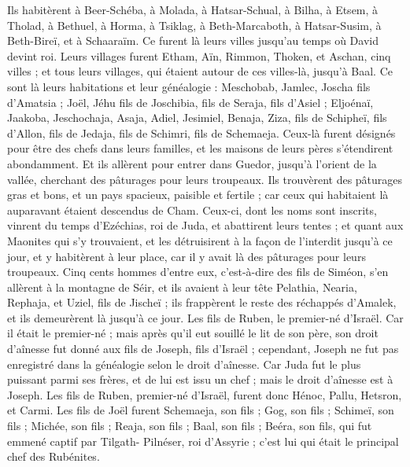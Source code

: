 \begin{multicols}{2}
Ils habitèrent à Beer-Schéba, à Molada, à Hatsar-Schual,
à Bilha, à Etsem, à Tholad,
à Bethuel, à Horma, à Tsiklag,
à Beth-Marcaboth, à Hatsar-Susim, à Beth-Bireï, et à Schaaraïm. Ce furent là leurs villes jusqu'au temps où David devint roi.
Leurs villages furent Etham, Aïn, Rimmon, Thoken, et Aschan, cinq villes ;
et tous leurs villages, qui étaient autour de ces villes-là, jusqu'à Baal. Ce sont là leurs habitations et leur généalogie :
Meschobab, Jamlec, Joscha fils d'Amatsia ;
Joël, Jéhu fils de Joschibia, fils de Seraja, fils d'Asiel ;
Eljoénaï, Jaakoba, Jeschochaja, Asaja, Adiel, Jesimiel, Benaja,
Ziza, fils de Schipheï, fils d'Allon, fils de Jedaja, fils de Schimri, fils de Schemaeja.
Ceux-là furent désignés pour être des chefs dans leurs familles, et les maisons de leurs pères s’étendirent abondamment.
Et ils allèrent pour entrer dans Guedor, jusqu'à l'orient de la vallée, cherchant des pâturages pour leurs troupeaux.
Ils trouvèrent des pâturages gras et bons, et un pays spacieux, paisible et fertile ; car ceux qui habitaient là auparavant étaient descendus de Cham.
Ceux-ci, dont les noms sont inscrits, vinrent du temps d'Ezéchias, roi de Juda, et abattirent leurs tentes ; et quant aux Maonites qui s’y trouvaient, et les détruisirent à la façon de l'interdit jusqu'à ce jour, et y habitèrent à leur place, car il y avait là des pâturages pour leurs troupeaux.
Cinq cents hommes d'entre eux, c'est-à-dire des fils de Siméon, s'en allèrent à la montagne de Séir, et ils avaient à leur tête Pelathia, Nearia, Rephaja, et Uziel, fils de Jischeï ;
ils frappèrent le reste des réchappés d'Amalek, et ils demeurèrent là jusqu'à ce jour.
\VerseOne{}Les fils de Ruben, le premier-né d'Israël. Car il était le premier-né ; mais après qu'il eut souillé le lit de son père, son droit d'aînesse fut donné aux fils de Joseph, fils d'Israël ; cependant, Joseph ne fut pas enregistré  dans la généalogie selon le droit d'aînesse.
Car Juda fut le plus puissant parmi ses frères, et de lui est issu un chef ; mais le droit d'aînesse est à Joseph.
Les fils de Ruben, premier-né d'Israël, furent donc Hénoc, Pallu, Hetsron, et Carmi.
Les fils de Joël furent  Schemaeja, son fils ; Gog, son fils ; Schimeï, son fils ;
Michée, son fils ; Reaja, son fils ; Baal,  son fils ;
Beéra, son fils, qui fut emmené captif par Tilgath- Pilnéser, roi d’Assyrie ; c'est lui qui était le principal chef des Rubénites.

\end{multicols}
